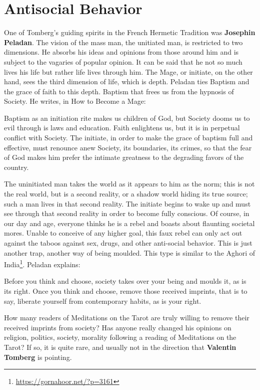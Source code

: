 \section{Antisocial Behavior}

One of Tomberg's guiding spirits in the French Hermetic Tradition was \textbf{Josephin Peladan}. The vision of the mass man, the unitiated man, is restricted to two dimensions. He absorbs his ideas and opinions from those around him and is subject to the vagaries of popular opinion. It can be said that he not so much lives his life but rather life lives through him. The Mage, or initiate, on the other hand, sees the third dimension of life, which is depth. Peladan ties Baptism and the grace of faith to this depth. Baptism that frees us from the hypnosis of Society. He writes, in How to Become a Mage:

\begin{quotex}
Baptism as an initiation rite makes us children of God, but Society dooms us to evil through is laws and education. Faith enlightens us, but it is in perpetual conflict with Society. The initiate, in order to make the grace of baptism full and effective, must renounce anew Society, its boundaries, its crimes, so that the fear of God makes him prefer the intimate greatness to the degrading favors of the country.
\end{quotex}


The uninitiated man takes the world as it appears to him as the norm; this is not the real world, but is a second reality, or a shadow world hiding its true source; such a man lives in that second reality. The initiate begins to wake up and must see through that second reality in order to become fully conscious. Of course, in our day and age, everyone thinks he is a rebel and boasts about flaunting societal mores. Unable to conceive of any higher goal, this faux rebel can only act out against the taboos against sex, drugs, and other anti-social behavior. This is just another trap, another way of being moulded. This type is similar to the Aghori of India\footnote{\url{https://gornahoor.net/?p=3161}}. Peladan explains:

\begin{quotex}
Before you think and choose, society takes over your being and moulds it, as is its right. Once you think and choose, remove those received imprints, that is to say, liberate yourself from contemporary habits, as is your right.
\end{quotex}


How many readers of Meditations on the Tarot are truly willing to remove their received imprints from society? Has anyone really changed his opinions on religion, politics, society, morality following a reading of Meditations on the Tarot? If so, it is quite rare, and usually not in the direction that \textbf{Valentin Tomberg} is pointing.

